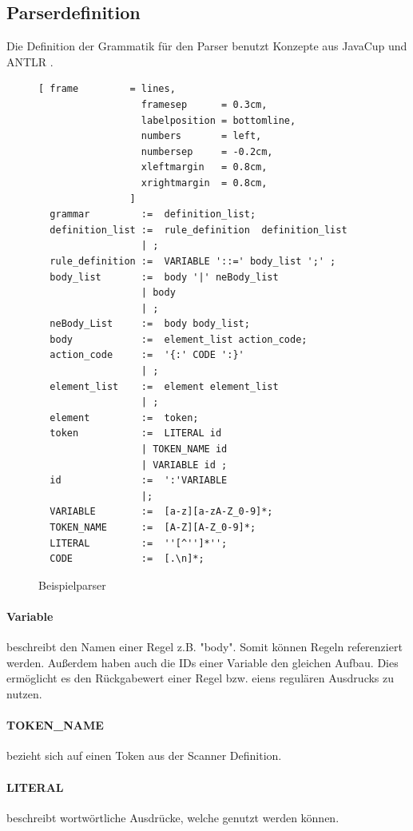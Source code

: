 \subsection{Parserdefinition}
Die Definition der Grammatik für den Parser benutzt Konzepte aus JavaCup und ANTLR .
\begin{figure}[!ht]
\begin{Verbatim}[ frame         = lines, 
                  framesep      = 0.3cm, 
                  labelposition = bottomline,
                  numbers       = left,
                  numbersep     = -0.2cm,
                  xleftmargin   = 0.8cm,
                  xrightmargin  = 0.8cm,
                ]
  grammar         :=  definition_list;
  definition_list :=  rule_definition  definition_list
	              | ;
  rule_definition :=  VARIABLE '::=' body_list ';' ;
  body_list       :=  body '|' neBody_list
	              | body
	              | ;
  neBody_List     :=  body body_list;
  body            :=  element_list action_code;
  action_code     :=  '{:' CODE ':}'
	              | ;
  element_list    :=  element element_list
	              | ;
  element         :=  token;
  token           :=  LITERAL id
	              | TOKEN_NAME id
	              | VARIABLE id ;
  id              :=  ':'VARIABLE
	              |;
  VARIABLE        :=  [a-z][a-zA-Z_0-9]*;
  TOKEN_NAME      :=  [A-Z][A-Z_0-9]*;
  LITERAL         :=  ''[^'']*'';
  CODE            :=  [.\n]*;
\end{Verbatim}
\caption{Beispielparser}
\label{fig:example_grammer}
\end{figure}
\paragraph{Variable} beschreibt den Namen einer Regel z.B. "body". Somit können Regeln referenziert werden.  Außerdem haben auch die IDs einer Variable den gleichen Aufbau. Dies ermöglicht es den Rückgabewert einer Regel bzw. eiens regulären Ausdrucks zu nutzen.
\paragraph{TOKEN\_NAME} bezieht sich auf einen Token aus der Scanner Definition.
\paragraph{LITERAL}  beschreibt wortwörtliche Ausdrücke, welche genutzt werden können. 
